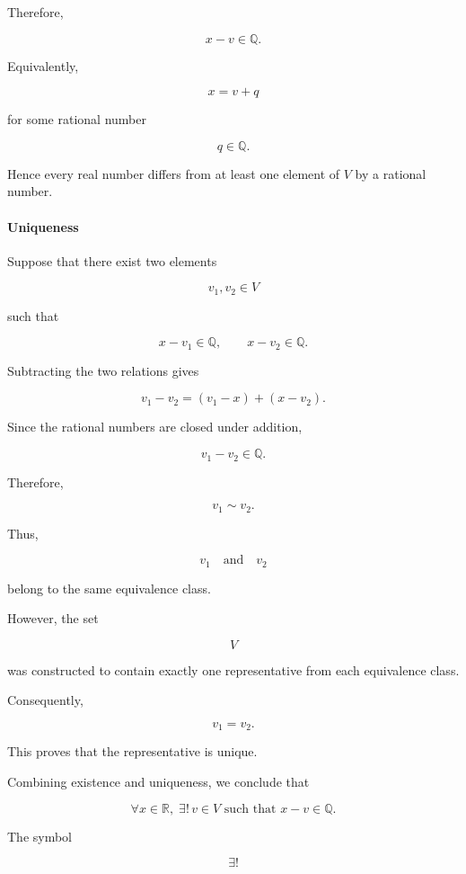 \documentclass[11pt]{article}
\begin{document}
	Therefore,
	
	\[
	x-v\in\mathbb Q.
	\]
	
	Equivalently,
	
	\[
	\boxed{
		x=v+q
	}
	\]
	
	for some rational number
	
	\[
	q\in\mathbb Q.
	\]
	
	Hence every real number differs from at least one element of \(V\) by a
	rational number.
	
	\bigskip
	
	\paragraph{Uniqueness}
	
	Suppose that there exist two elements
	
	\[
	v_1,v_2\in V
	\]
	
	such that
	
	\[
	x-v_1\in\mathbb Q,
	\qquad
	x-v_2\in\mathbb Q.
	\]
	
	Subtracting the two relations gives
	
	\[
	v_1-v_2
	=
	(v_1-x)+(x-v_2).
	\]
	
	Since the rational numbers are closed under addition,
	
	\[
	v_1-v_2\in\mathbb Q.
	\]
	
	Therefore,
	
	\[
	v_1\sim v_2.
	\]
	
	Thus,
	
	\[
	v_1
	\quad\text{and}\quad
	v_2
	\]
	
	belong to the same equivalence class.
	
	However, the set
	
	\[
	V
	\]
	
	was constructed to contain exactly one representative from each equivalence
	class.
	
	Consequently,
	
	\[
	\boxed{
		v_1=v_2.
	}
	\]
	
	This proves that the representative is unique.
	
	\bigskip
	
	Combining existence and uniqueness, we conclude that
	
	\[
	\boxed{
		\forall x\in\mathbb R,\;
		\exists!\,v\in V
		\text{ such that }
		x-v\in\mathbb Q.
	}
	\]
	
	The symbol
	
	\[
	\exists!
	\]
	
\end{document}
